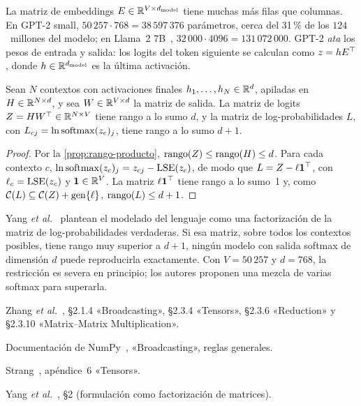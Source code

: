 La matriz de embeddings $E\in\mathbb{R}^{V\times d_{\mathrm{model}}}$ tiene muchas más filas que columnas. En GPT-2 small, $50\,257\cdot 768=38\,597\,376$ parámetros, cerca del 31\,\% de los $124$~millones del modelo; en Llama~2 7B~\cite{llama2}, $32\,000\cdot 4096=131\,072\,000$. GPT-2 \emph{ata} los pesos de entrada y salida: los logits del token siguiente se calculan como $z=hE^{\top}$, donde $h\in\mathbb{R}^{d_{\mathrm{model}}}$ es la última activación.

\begin{proposicion}\label{prop:cuello}
Sean $N$ contextos con activaciones finales $h_1,\dots,h_N\in\mathbb{R}^{d}$, apiladas en $H\in\mathbb{R}^{N\times d}$, y sea $W\in\mathbb{R}^{V\times d}$ la matriz de salida. La matriz de logits $Z=HW^{\top}\in\mathbb{R}^{N\times V}$ tiene rango a lo sumo $d$, y la matriz de log-probabilidades $L$, con $L_{cj}=\ln\operatorname{softmax}(z_c)_j$, tiene rango a lo sumo $d+1$.
\end{proposicion}

\begin{proof}
Por la \cref{prop:rango-producto}, $\operatorname{rango}(Z)\le\operatorname{rango}(H)\le d$. Para cada contexto $c$, $\ln\operatorname{softmax}(z_c)_j=z_{cj}-\operatorname{LSE}(z_c)$, de modo que $L=Z-\ell\mathbf{1}^{\top}$, con $\ell_c=\operatorname{LSE}(z_c)$ y $\mathbf{1}\in\mathbb{R}^{V}$. La matriz $\ell\mathbf{1}^{\top}$ tiene rango a lo sumo~1 y, como $\mathcal{C}(L)\subseteq\mathcal{C}(Z)+\operatorname{gen}\{\ell\}$, $\operatorname{rango}(L)\le d+1$.
\end{proof}

Yang \emph{et al.}~\cite{yang-softmax} plantean el modelado del lenguaje como una factorización de la matriz de log-probabilidades verdaderas. Si esa matriz, sobre todos los contextos posibles, tiene rango muy superior a $d+1$, ningún modelo con salida softmax de dimensión $d$ puede reproducirla exactamente. Con $V=50\,257$ y $d=768$, la restricción es severa en principio; los autores proponen una mezcla de varias softmax para superarla.

\begin{lecturas}
\item Zhang \emph{et al.}~\cite{d2l}, §2.1.4 «Broadcasting», §2.3.4 «Tensors», §2.3.6 «Reduction» y §2.3.10 «Matrix--Matrix Multiplication».
\item Documentación de NumPy~\cite{numpy-bc}, «Broadcasting», reglas generales.
\item Strang~\cite{strang-ila}, apéndice~6 «Tensors».
\item Yang \emph{et al.}~\cite{yang-softmax}, §2 (formulación como factorización de matrices).
\end{lecturas}

